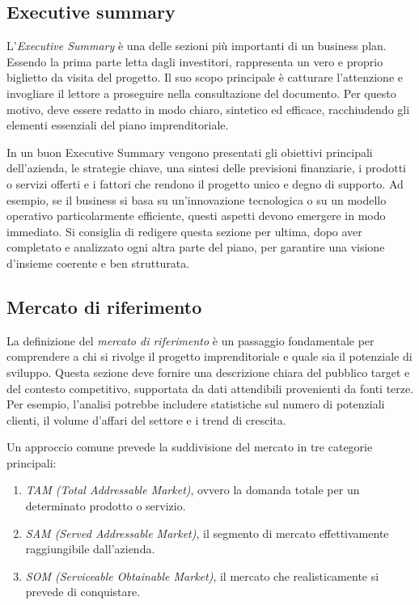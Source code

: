 \subsection*{Executive summary}
L’\textit{Executive Summary} è una delle sezioni più importanti di un business plan. Essendo la prima parte letta dagli investitori, rappresenta un vero e proprio biglietto da visita del progetto. Il suo scopo principale è catturare l’attenzione e invogliare il lettore a proseguire nella consultazione del documento. Per questo motivo, deve essere redatto in modo chiaro, sintetico ed efficace, racchiudendo gli elementi essenziali del piano imprenditoriale.

In un buon Executive Summary vengono presentati gli obiettivi principali dell’azienda, le strategie chiave, una sintesi delle previsioni finanziarie, i prodotti o servizi offerti e i fattori che rendono il progetto unico e degno di supporto. Ad esempio, se il business si basa su un’innovazione tecnologica o su un modello operativo particolarmente efficiente, questi aspetti devono emergere in modo immediato. Si consiglia di redigere questa sezione per ultima, dopo aver completato e analizzato ogni altra parte del piano, per garantire una visione d’insieme coerente e ben strutturata.

\subsection*{Mercato di riferimento}
La definizione del \textit{mercato di riferimento} è un passaggio fondamentale per comprendere a chi si rivolge il progetto imprenditoriale e quale sia il potenziale di sviluppo. Questa sezione deve fornire una descrizione chiara del pubblico target e del contesto competitivo, supportata da dati attendibili provenienti da fonti terze. Per esempio, l’analisi potrebbe includere statistiche sul numero di potenziali clienti, il volume d’affari del settore e i trend di crescita.

Un approccio comune prevede la suddivisione del mercato in tre categorie principali:
\begin{enumerate}
    \item \textit{TAM (Total Addressable Market)}, ovvero la domanda totale per un determinato prodotto o servizio.
    \item \textit{SAM (Served Addressable Market)}, il segmento di mercato effettivamente raggiungibile dall’azienda.
    \item \textit{SOM (Serviceable Obtainable Market)}, il mercato che realisticamente si prevede di conquistare.
\end{enumerate}

